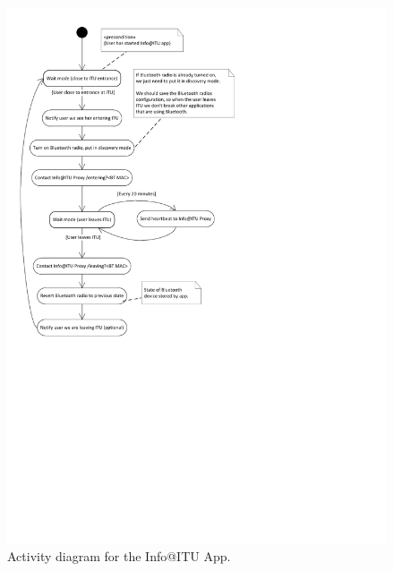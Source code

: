 \documentclass{ubicomp2011}
\begin{document}
\begin{figure}[t]
\begin{center}
\includegraphics[width=0.90\columnwidth]{android-app-activity-diagram.pdf}
\end{center}
\caption{Activity diagram for the Info@ITU App.}
\label{fig:android-app-activity-diagram}
\end{figure}

%
%
\end{document}
